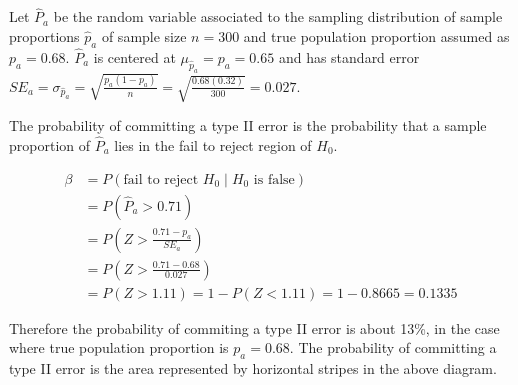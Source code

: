 \documentclass{article}
\begin{document}
Let $\hat{P}_a$ be the random variable associated to the sampling distribution of sample proportions $\hat{p}_a$ of sample size $n=300$ and true population proportion 
assumed as $p_a = 0.68$. $\hat{P}_a$  is
centered at $\mu_{\hat{p}_a}=p_a=0.65$ and has standard error
$SE_a=\sigma_{\hat{p}_a}=\sqrt{\frac{p_a(1-p_a)}{n}}=\sqrt{\frac{0.68(0.32)}{300}}=0.027$.\\

\begin{center}
\end{center}

The probability of committing a type II error is the probability that a sample proportion of $\hat{P}_a$ lies in the fail to reject region of $H_0$. 

\begin{align*}
\beta &= P(\text{fail to reject $H_0$}\;|\;\text{$H_0$ is false})\\
&= P(\hat{P}_a>0.71)\\
&= P\left(Z>\frac{0.71-p_a}{SE_a}\right)\\
&= P\left(Z>\frac{0.71-0.68}{0.027}\right)\\
&= P(Z>1.11) = 1 - P(Z<1.11) = 1 - 0.8665 = 0.1335
\end{align*}

Therefore the probability of commiting a type II error 
is about 13\%, in the case where true population proportion is $p_a=0.68$. 
The probability of committing a type II error is the area represented by horizontal stripes in the above diagram.\\
\vspace{0.1in}
\end{document}
